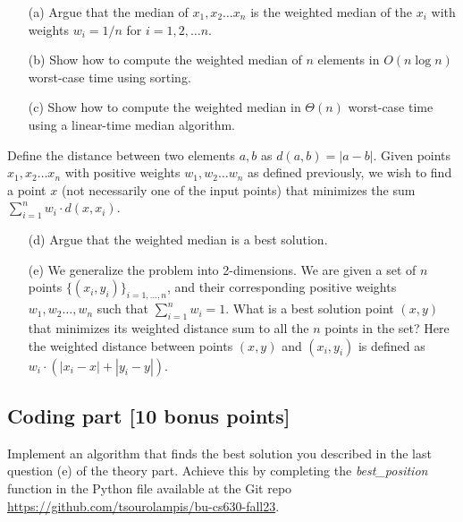 \documentclass[11pt]{article}
\theoremstyle{theorem}
\theoremstyle{lemma}
\theoremstyle{corollary}
\theoremstyle{definition}
\begin{document}
\begin{enumerate}
    \item[(a)] Argue that the median of $x_1,x_2\dots x_n$ is the weighted median of the $x_i$ with weights $w_i=1/n$ for $i=1,2,\dots n$.
    \item[(b)] Show how to compute the weighted median of $n$ elements in $O(n\log n)$ worst-case time using sorting.
    \item[(c)] Show how to compute the weighted median in $\Theta(n)$ worst-case time using a linear-time median algorithm.
   \end{enumerate} 
    Define the distance between two elements $a,b$ as $d(a,b)=|a-b|$. Given points $x_1,x_2\dots x_n$ with positive weights $w_1,w_2\dots w_n$ as defined previously, we wish to find a point $x$ (not necessarily one of the input points) that minimizes the sum $\sum_{i=1}^n w_i\cdot d(x,x_i)$. 
\begin{enumerate}

    \item[(d)] Argue that the weighted median is a best solution.

    \item[(e)] We generalize the problem into 2-dimensions. We are given a set of $n$ points $\{(x_i,y_i)\}_{i=1,\ldots,n}$, and their corresponding positive weights $w_1,w_2\dots ,w_n$ such that $\sum_{i=1}^n w_i=1$. What is a best solution point $(x,y)$ that minimizes its weighted distance sum to all the $n$ points in the set? Here the weighted distance between points $(x,y)$ and $(x_i,y_i)$ is defined as $w_i\cdot(|x_i-x|+|y_i-y|)$.
\end{enumerate}

\subsection*{Coding part [10 bonus points]}

Implement an algorithm that finds the best solution you described in the last question (e) of the theory part. Achieve this by completing the \textit{best\_position} function in the Python file available at the Git repo \url{https://github.com/tsourolampis/bu-cs630-fall23}. 
\end{document}
